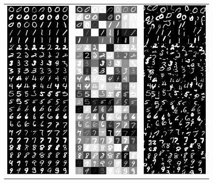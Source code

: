 \documentclass[10pt,letterpaper]{article}
\begin{document}
\begin{figure}[h]
\centering
\begin{tabular}{ccc}
\includegraphics[width=0.28\linewidth]{digits-normal.png} & 
\includegraphics[width=0.28\linewidth]{digits-scaled.png} & 
\includegraphics[width=0.28\linewidth]{digits-jittered.png} \\

\end{tabular}
\end{figure}
\end{document}
